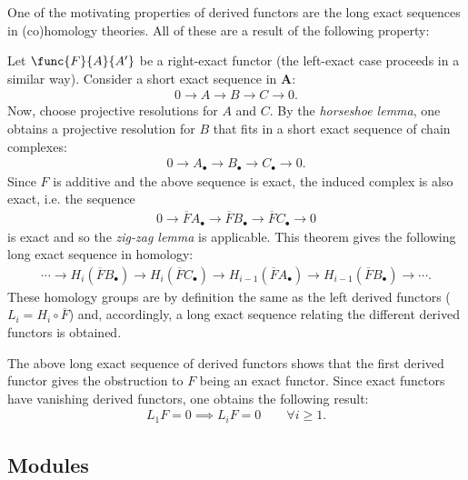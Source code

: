 	One of the motivating properties of derived functors are the long exact sequences in (co)homology theories. All of these are a result of the following property:
	\begin{property}
		Let $\func{F}{A}{A'}$ be a right-exact functor (the left-exact case proceeds in a similar way). Consider a short exact sequence in $\mathbf{A}$:
		\begin{gather}
			0\longrightarrow A\longrightarrow B\longrightarrow C\longrightarrow 0.
		\end{gather}
		Now, choose projective resolutions for $A$ and $C$. By the \textit{horseshoe lemma}, one obtains a projective resolution for $B$ that fits in a short exact sequence of chain complexes:
		\begin{gather}
			0\longrightarrow A_\bullet\longrightarrow B_\bullet\longrightarrow C_\bullet\longrightarrow 0.
		\end{gather}
		Since $F$ is additive and the above sequence is exact, the induced complex is also exact, i.e. the sequence
		\begin{gather}
			0\longrightarrow\overline{F}A_\bullet\longrightarrow\overline{F}B_\bullet\longrightarrow\overline{F}C_\bullet\longrightarrow0
		\end{gather}
		is exact and so the \textit{zig-zag lemma} is applicable. This theorem gives the following long exact sequence in homology:
		\begin{gather}
			\cdots\longrightarrow H_i(\overline{F}B_\bullet)\longrightarrow H_i(\overline{F}C_\bullet) \longrightarrow H_{i-1}(\overline{F}A_\bullet) \longrightarrow H_{i-1}(\overline{F}B_\bullet) \longrightarrow\cdots.
		\end{gather}
		These homology groups are by definition the same as the left derived functors ($L_i = H_i\circ\overline{F}$) and, accordingly, a long exact sequence relating the different derived functors is obtained.
	\end{property}
	\begin{result}
		The above long exact sequence of derived functors shows that the first derived functor gives the obstruction to $F$ being an exact functor. Since exact functors have vanishing derived functors, one obtains the following result:
		\begin{gather}
			L_1F = 0\implies L_iF=0\qquad\forall i\geq 1.
		\end{gather}
	\end{result}

\subsection{Modules}\label{section:tor_ext}

